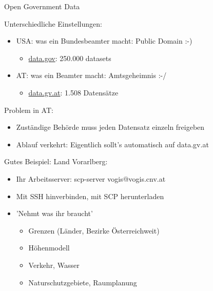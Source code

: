 \documentclass{beamer}
\begin{document}
\begin{frame}{Open Government Data}

Unterschiedliche Einstellungen:
\begin{itemize}
    \item USA: was ein Bundesbeamter macht: Public Domain :-)
    \begin{itemize}
        \item  \href{http://data.gov}{data.gov}: 250.000 datasets
    \end{itemize}
    \item AT: was ein Beamter macht: Amtsgeheimnis :-/
    \begin{itemize}
        \item \href{data.gv.at}{data.gv.at}: 1.508 Datensätze
    \end{itemize}
\end{itemize}

\pause

Problem in AT: 
\begin{itemize}
    \item Zuständige Behörde muss jeden Datensatz einzeln freigeben
    \item Ablauf verkehrt: Eigentlich sollt's automatisch auf data.gv.at
\end{itemize}
\pause
Gutes Beispiel: Land Vorarlberg: 
\begin{itemize}
    \item Ihr Arbeitsserver: scp-server vogis@vogis.cnv.at 
    \item Mit SSH hinverbinden, mit SCP herunterladen 
    \item 'Nehmt was ihr braucht'
    \begin{itemize}
        \item Grenzen (Länder, Bezirke Österreichweit)
        \item Höhenmodell
        \item Verkehr, Wasser
        \item Naturschutzgebiete, Raumplanung
    \end{itemize}
\end{itemize}

\end{frame}






\end{document}
